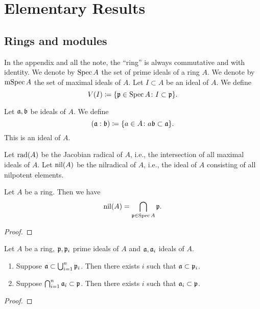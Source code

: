 \section{Elementary Results}


\subsection{Rings and modules}

    In the appendix and all the note, the ``ring'' is always commutative and with identity.
    We denote by \(\operatorname{Spec} A\) the set of prime ideals of a ring \(A\).
    We denote by \(\operatorname{mSpec} A\) the set of maximal ideals of \(A\).
    Let \(I \subset A\) be an ideal of \(A\).
    We define 
    \[ V(I) \coloneqq \{ {\mathfrak{p}} \in \operatorname{Spec} A \colon I \subset {\mathfrak{p}}\}. \]

    Let \({\mathfrak{a}},{\mathfrak{b}}\) be ideals of \(A\).
    We define 
    \[ ({\mathfrak{a}} : {\mathfrak{b}}) \coloneqq \{ a \in A \colon a{\mathfrak{b}} \subset {\mathfrak{a}}\}. \]
    This is an ideal of \(A\).
    
    Let \(\operatorname{rad}(A)\) be the Jacobian radical of \(A\), i.e., the intersection of all maximal ideals of \(A\).
    Let \(\operatorname{nil}(A)\) be the nilradical of \(A\), i.e., the ideal of \(A\) consisting of all nilpotent elements.
    
    \begin{proposition}
        Let \(A\) be a ring.
        Then we have 
        \[ \operatorname{nil}(A) = \bigcap_{{\mathfrak{p}} \in \operatorname{Spec} A} {\mathfrak{p}}. \]
    \end{proposition}
    \begin{proof}
    \end{proof}

    \begin{proposition}\label{prop: prime avoidance lemma primity of prime ideals}
        Let $A$ be a ring, ${\mathfrak{p}},{\mathfrak{p}}_i$ prime ideals of $A$ and \({\mathfrak{a}},{\mathfrak{a}}_i\) ideals of $A$. 
        \begin{enumerate}
            \item Suppose \({\mathfrak{a}} \subset \bigcup_{i=1}^n {\mathfrak{p}}_i\). 
            Then there exists \(i\) such that \({\mathfrak{a}} \subset {\mathfrak{p}}_i\).
            \item Suppose \(\bigcap_{i=1}^n {\mathfrak{a}}_i \subset {\mathfrak{p}}\). 
            Then there exists \(i\) such that \({\mathfrak{a}}_i \subset {\mathfrak{p}}\).
        \end{enumerate}
    \end{proposition}
    \begin{proof}
    \end{proof}

